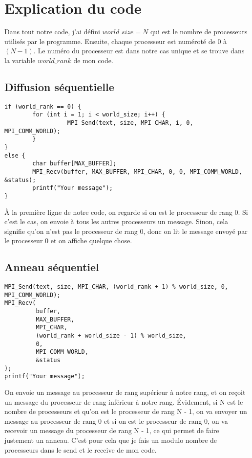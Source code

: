 \documentclass[11pt]{article}
\begin{document}
\section{Explication du code}
\label{sec:org8850e8c}

Dans tout notre code, j'ai défini \(world\_size = N\) qui est le nombre de processeurs utilisés par le programme.
Ensuite, chaque processeur est numéroté de 0 à \((N - 1)\). Le numéro du processeur est dans notre cas unique et
se trouve dans la variable \(world\_rank\) de mon code.

\subsection{Diffusion séquentielle}
\label{sec:org0e6d1f0}
\begin{verbatim}
if (world_rank == 0) {
        for (int i = 1; i < world_size; i++) {
                  MPI_Send(text, size, MPI_CHAR, i, 0, MPI_COMM_WORLD);
        }
}
else {
        char buffer[MAX_BUFFER];
        MPI_Recv(buffer, MAX_BUFFER, MPI_CHAR, 0, 0, MPI_COMM_WORLD, &status);
        printf("Your message");
}

\end{verbatim}

À la première ligne de notre code, on regarde si on est le processeur de rang 0.
Si c'est le cas, on envoie à tous les autres processeurs un message.
Sinon, cela signifie qu'on n'est pas le processeur de rang 0, donc on lit le message envoyé
par le processeur 0 et on affiche quelque chose.

\subsection{Anneau séquentiel}
\label{sec:org1329913}
\begin{verbatim}
MPI_Send(text, size, MPI_CHAR, (world_rank + 1) % world_size, 0, MPI_COMM_WORLD);
MPI_Recv(
         buffer,
         MAX_BUFFER,
         MPI_CHAR,
         (world_rank + world_size - 1) % world_size,
         0,
         MPI_COMM_WORLD,
         &status
);
printf("Your message");

\end{verbatim}
On envoie un message au processeur de rang supérieur à notre rang, et on reçoit un message du processeur de rang inférieur à notre rang.
Évidement, si N est le nombre de processeurs et qu'on est le processeur de rang N - 1, on va envoyer un message au processeur de rang 0 et 
si on est le processeur de rang 0, on va recevoir un message du processeur de rang N - 1, ce qui permet de faire justement un anneau.
C'est pour cela que je fais un modulo nombre de processeurs dans le send et le receive de mon code.
\end{document}
